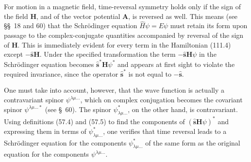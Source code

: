 For motion in a magnetic field, time-reversal symmetry holds only if the sign
of the field $\mathbf H$, and of the vector potential $\mathbf A$, is reversed
as well. This means (see \S\S~18 and 60) that the Schrödinger equation
$\hat H\psi=E\psi$ must retain its form upon passage to the complex-conjugate
quantities accompanied by reversal of the sign of $\mathbf H$. This is
immediately evident for every term in the Hamiltonian (111.4) except
$-\hat{\mathbf s}\mathbf H$. Under the specified transformation the term
$-\hat{\mathbf s}\mathbf H\psi$ in the Schrödinger equation becomes
$\hat{\mathbf s}^{*}\mathbf H\psi^{*}$ and appears at first sight to violate
the required invariance, since the operator $\hat{\mathbf s}^{*}$ is not equal
to $-\hat{\mathbf s}$.

One must take into account, however, that the wave function is actually a
contravariant spinor $\psi^{\lambda\mu\ldots}$, which on complex conjugation
becomes the covariant spinor $\psi^{\lambda\mu\ldots *}$ (see \S~60). The
spinor $\psi^{*}_{\lambda\mu\ldots}$, on the other hand, is contravariant.
Using definitions (57.4) and (57.5) to find the components of
$(\hat{\mathbf s}\mathbf H\psi)^*$ and expressing them in terms of
$\psi^{*}_{\lambda\mu\ldots}$, one verifies that time reversal leads to a
Schrödinger equation for the components $\psi^{*}_{\lambda\mu\ldots}$ of the
same form as the original equation for the components
$\psi^{\lambda\mu\ldots}$.
